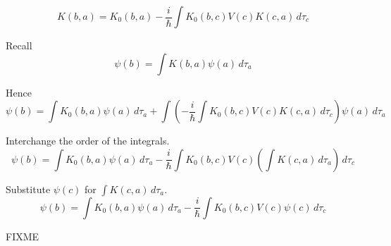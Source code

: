 


\begin{equation*}
K(b,a)=K_0(b,a)-\frac{i}{\hbar}\int K_0(b,c)V(c)K(c,a)\,d\tau_c
\end{equation*}

Recall
\begin{equation*}
\psi(b)=\int K(b,a)\psi(a)\,d\tau_a
\end{equation*}

Hence
\begin{equation*}
\psi(b)=\int K_0(b,a)\psi(a)\,d\tau_a
+\int\left(-\frac{i}{\hbar}\int K_0(b,c)V(c)K(c,a)\,d\tau_c\right)\psi(a)\,d\tau_a
\end{equation*}

Interchange the order of the integrals.
\begin{equation*}
\psi(b)=\int K_0(b,a)\psi(a)\,d\tau_a
-\frac{i}{\hbar}\int K_0(b,c)V(c)\left(\int K(c,a)\,d\tau_a\right)\,d\tau_c
\end{equation*}

Substitute $\psi(c)$ for $\int K(c,a)\,d\tau_a$.
\begin{equation*}
\psi(b)=\int K_0(b,a)\psi(a)\,d\tau_a
-\frac{i}{\hbar}\int K_0(b,c)V(c)\psi(c)\,d\tau_c
\end{equation*}

FIXME



